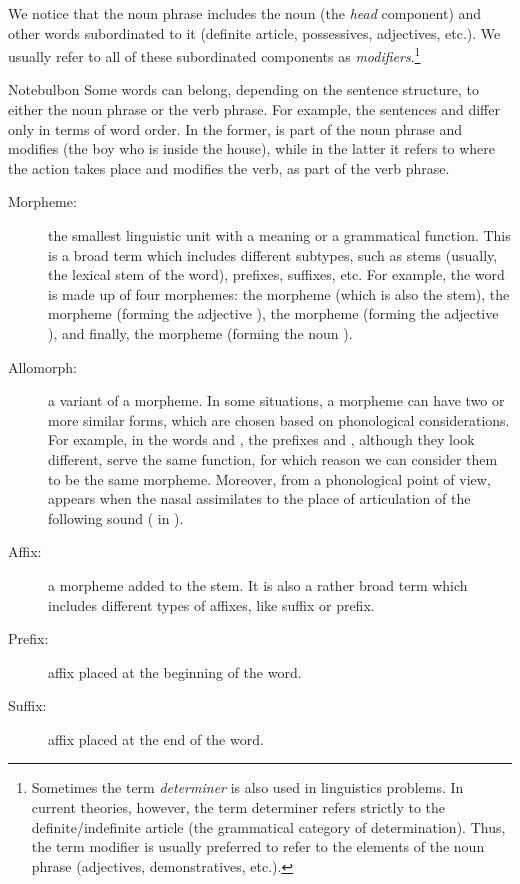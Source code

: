 \begin{refsection}
We notice that the noun phrase includes the noun (the \textit{head} component) and other words subordinated to it (definite article, possessives, adjectives, etc.). We usually refer to all of these subordinated components as \textit{modifiers}.\footnote{Sometimes the term \textit{determiner} is also used in linguistics problems. In current theories, however, the term determiner refers strictly to the definite/indefinite article (the grammatical category of determination). Thus, the term modifier is usually preferred to refer to the elements of the noun phrase (adjectives, demonstratives, etc.).}

\begin{tblsfilledsymbol}{Note}{bulbon}
Some words can belong, depending on the sentence structure, to either the noun phrase or the verb phrase. For example, the sentences  and  differ only in terms of word order. In the former,  is part of the noun phrase and modifies  (the boy who is inside the house), while in the latter it refers to where the action takes place and modifies the verb, as part of the verb phrase.
    \end{tblsfilledsymbol}

\begin{description}
    \item[Morpheme:] the smallest linguistic unit with a meaning or a grammatical function. This is a broad term which includes different subtypes, such as stems (usually, the lexical stem of the word), prefixes, suffixes, etc. For example, the word  is made up of four morphemes: the morpheme  (which is also the stem), the morpheme  (forming the adjective ), the morpheme  (forming the adjective ), and finally, the morpheme  (forming the noun ).
    \item[Allomorph:] a variant of a morpheme. In some situations, a morpheme can have two or more similar forms, which are chosen based on phonological considerations. For example, in the words  and , the prefixes  and , although they look different, serve the same function, for which reason we can consider them to be the same morpheme. Moreover, from a phonological point of view,  appears when the nasal assimilates to the place of articulation of the following sound ( in ).
    \item[Affix:]  a morpheme added to the stem. It is also a rather broad term which includes different types of affixes, like suffix or prefix.
    \item[Prefix:] affix placed at the beginning of the word.
    \item[Suffix:] affix placed at the end of the word.
\end{description}


\end{refsection}
